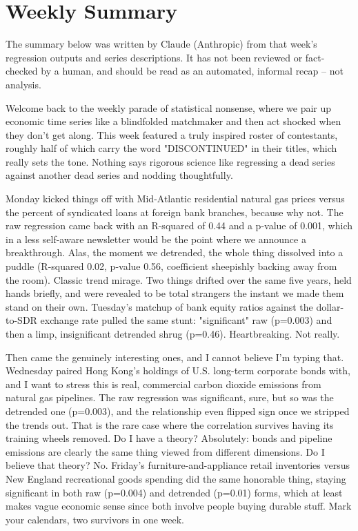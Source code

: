 \section{Weekly Summary}

\begin{tcolorbox}[colback=yellow!10,colframe=black!50,title=AI-Generated Content]
\noindent The summary below was written by Claude (Anthropic) from that week's regression outputs and series descriptions. It has not been reviewed or fact-checked by a human, and should be read as an automated, informal recap -- not analysis.
\end{tcolorbox}

Welcome back to the weekly parade of statistical nonsense, where we pair up economic time series like a blindfolded matchmaker and then act shocked when they don't get along. This week featured a truly inspired roster of contestants, roughly half of which carry the word "DISCONTINUED" in their titles, which really sets the tone. Nothing says rigorous science like regressing a dead series against another dead series and nodding thoughtfully.

Monday kicked things off with Mid-Atlantic residential natural gas prices versus the percent of syndicated loans at foreign bank branches, because why not. The raw regression came back with an R-squared of 0.44 and a p-value of 0.001, which in a less self-aware newsletter would be the point where we announce a breakthrough. Alas, the moment we detrended, the whole thing dissolved into a puddle (R-squared 0.02, p-value 0.56, coefficient sheepishly backing away from the room). Classic trend mirage. Two things drifted over the same five years, held hands briefly, and were revealed to be total strangers the instant we made them stand on their own. Tuesday's matchup of bank equity ratios against the dollar-to-SDR exchange rate pulled the same stunt: "significant" raw (p=0.003) and then a limp, insignificant detrended shrug (p=0.46). Heartbreaking. Not really.

Then came the genuinely interesting ones, and I cannot believe I'm typing that. Wednesday paired Hong Kong's holdings of U.S. long-term corporate bonds with, and I want to stress this is real, commercial carbon dioxide emissions from natural gas pipelines. The raw regression was significant, sure, but so was the detrended one (p=0.003), and the relationship even flipped sign once we stripped the trends out. That is the rare case where the correlation survives having its training wheels removed. Do I have a theory? Absolutely: bonds and pipeline emissions are clearly the same thing viewed from different dimensions. Do I believe that theory? No. Friday's furniture-and-appliance retail inventories versus New England recreational goods spending did the same honorable thing, staying significant in both raw (p=0.004) and detrended (p=0.01) forms, which at least makes vague economic sense since both involve people buying durable stuff. Mark your calendars, two survivors in one week.

